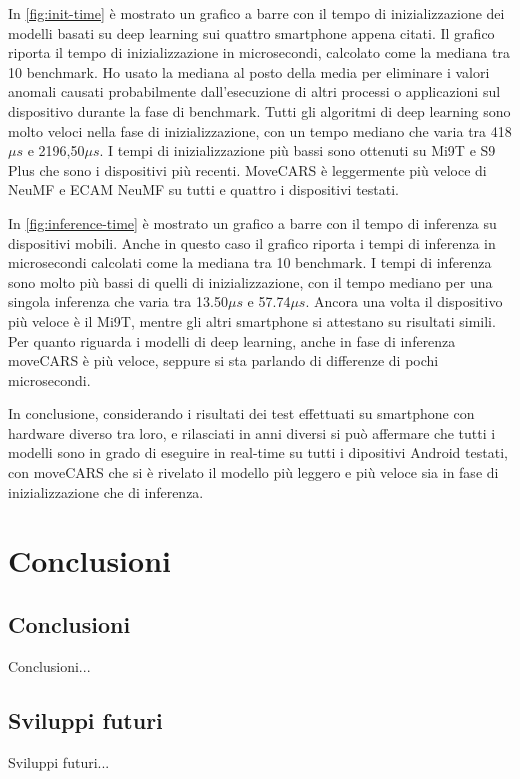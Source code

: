 \documentclass[12pt,italian]{report}
\begin{document}
\noindent In \autoref{fig:init-time} è mostrato un grafico a barre con il tempo di inizializzazione dei modelli basati su deep learning sui quattro smartphone appena citati. Il grafico riporta il tempo di inizializzazione in microsecondi, calcolato come la mediana tra 10 benchmark. Ho usato la mediana al posto della media per eliminare i valori anomali causati probabilmente dall'esecuzione di altri processi o applicazioni sul dispositivo durante la fase di benchmark. Tutti gli algoritmi di deep learning sono molto veloci nella fase di inizializzazione, con un tempo mediano che varia tra 418$\mu s$ e 2196,50$\mu s$. I tempi di inizializzazione più bassi sono ottenuti su Mi9T e S9 Plus che sono i dispositivi più recenti. MoveCARS è leggermente più veloce di NeuMF e ECAM NeuMF su tutti e quattro i dispositivi testati. 

In \autoref{fig:inference-time} è mostrato un grafico a barre con il tempo di inferenza su dispositivi mobili. Anche in questo caso il grafico riporta i tempi di inferenza in microsecondi calcolati come la mediana tra 10 benchmark. I tempi di inferenza sono molto più bassi di quelli di inizializzazione, con il tempo mediano per una singola inferenza che varia tra 13.50$\mu s$ e 57.74$\mu s$. Ancora una volta il dispositivo più veloce è il Mi9T, mentre gli altri smartphone si attestano su risultati simili. Per quanto riguarda i modelli di deep learning, anche in fase di inferenza moveCARS è più veloce, seppure si sta parlando di differenze di pochi microsecondi. 

In conclusione, considerando i risultati dei test effettuati su smartphone con hardware diverso tra loro, e rilasciati in anni diversi si può affermare che tutti i modelli sono in grado di eseguire in real-time su tutti i dipositivi Android testati, con moveCARS che si è rivelato il modello più leggero e più veloce sia in fase di inizializzazione che di inferenza.


% 
% 

\chapter{Conclusioni} \label{chap:conclusioni}

\section{Conclusioni}

Conclusioni...

\section{Sviluppi futuri}

Sviluppi futuri...



%
%



\end{document}
